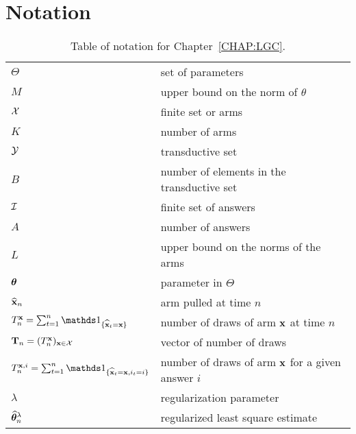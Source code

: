 \section{Notation}\label{app:lgc.notations}

\begin{table}[ht]
	\centering
	\caption{Table of notation for Chapter~\ref{CHAP:LGC}.}
	\begin{tabular}{@{}l|l@{}}
		\toprule
		\thead{Notation} & \thead{Meaning} \\ \midrule
		$\Theta$ & set of parameters \\
        $M$ & upper bound on the norm of $\theta$\\
		$\mathcal{X}$ & finite set or arms  \\
        $K$ & number of arms \\
        $\mathcal{Y}$ & transductive set \\
        $B$ & number of elements in the transductive set \\
        $\mathcal{I}$ & finite set of answers \\
        $A$ & number of answers \\
        $L$ & upper bound on the norms of the arms\\
        ${\boldsymbol \theta}$ & parameter in $\Theta$ \\
        $\widehat{{\bf x}}_n$ & arm pulled at time $n$ \\
        $T_n^\bx = \sum_{t=1}^n \ind_{\{\hbx_t = \bx\}}$ & number of draws of arm ${\bf x}$ at time $n$\\
        ${\bf T}_n =(T_n^{\bf x})_{{\bf x}\in\mathcal{X}}$ & vector of number of draws\\
        $T_n^{\bx,i} = \sum_{t=1}^n \ind_{\{\hbx_t = \bx, i_t = i\}}$ & number of draws of arm ${\bf x}$ for a given answer $i$\\
        $\lambda$ & regularization parameter\\
        $\widehat{{\boldsymbol \theta}}_n^\lambda$ & regularized least square estimate\\
		\bottomrule
	\end{tabular}
\end{table}
